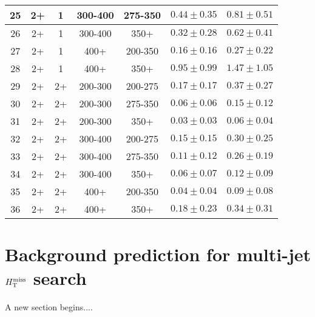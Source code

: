 \begin{table}[htbp]
{\begin{tabular}{|c|c|c|c|c||c|c|}
 \hline
             25 &              2+ &               1 &         300-400 &         275-350 & $0.44 \pm 0.35$ & $ 0.81 \pm 0.51 $\\
 \hline
             26 &              2+ &               1 &         300-400 &            350+ & $0.32 \pm 0.28$ & $ 0.62 \pm 0.41 $\\
 \hline
             27 &              2+ &               1 &            400+ &         200-350 & $0.16 \pm 0.16$ & $ 0.27 \pm 0.22 $\\
 \hline
             28 &              2+ &               1 &            400+ &            350+ & $0.95 \pm 0.99$ & $ 1.47 \pm 1.05 $\\
 \hline
             29 &              2+ &              2+ &         200-300 &         200-275 & $0.17 \pm 0.17$ & $ 0.37 \pm 0.27 $\\
 \hline
             30 &              2+ &              2+ &         200-300 &         275-350 & $0.06 \pm 0.06$ & $ 0.15 \pm 0.12 $\\
 \hline
             31 &              2+ &              2+ &         200-300 &            350+ & $0.03 \pm 0.03$ & $ 0.06 \pm 0.04 $\\
 \hline
             32 &              2+ &              2+ &         300-400 &         200-275 & $0.15 \pm 0.15$ & $ 0.30 \pm 0.25 $\\
 \hline
             33 &              2+ &              2+ &         300-400 &         275-350 & $0.11 \pm 0.12$ & $ 0.26 \pm 0.19 $\\
 \hline
             34 &              2+ &              2+ &         300-400 &            350+ & $0.06 \pm 0.07$ & $0.12 \pm 0.09 $\\
 \hline
             35 &              2+ &              2+ &            400+ &         200-350 & $0.04 \pm 0.04$ & $ 0.09 \pm 0.08 $\\
 \hline
             36 &              2+ &              2+ &            400+ &            350+ & $0.18 \pm 0.23$ & $ 0.34 \pm 0.31 $\\
 \hline
\end{tabular}
}
\end{table}


\section{Background prediction for multi-jet $H_{\text{T}}^{\rm miss}$ search}

A new section begins....

